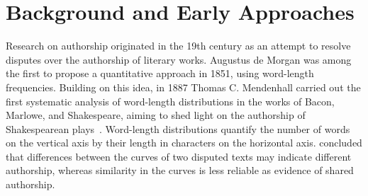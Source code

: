 \section{Background and Early Approaches}
\label{sec:origin}

Research on authorship originated in the 19th century as an attempt to resolve disputes over the authorship of literary works. 
Augustus de Morgan was among the first to propose a quantitative approach in 1851, using word-length frequencies. 
Building on this idea, in 1887 Thomas C. Mendenhall carried out the first systematic analysis of word-length distributions in the works of Bacon, Marlowe, and Shakespeare, aiming to shed light on the authorship of Shakespearean plays~\citep{neal_surveying_2018,stamatatos_survey_2009}.
Word-length distributions quantify the number of words on the vertical axis by their length in characters on the horizontal axis. 
\citet{wordlengths_mendenhall_1887} concluded that differences between the curves of two disputed texts may indicate different authorship, whereas similarity in the curves is less reliable as evidence of shared authorship.

